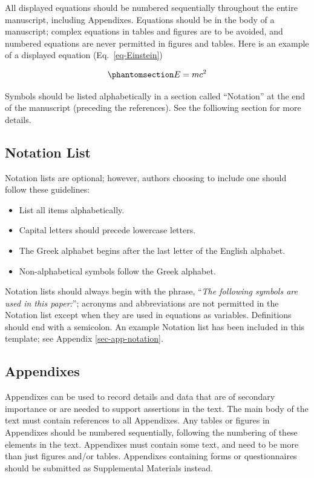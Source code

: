 \documentclass[Journal,LineNumbers]{ascelike-new}
\begin{document}
All displayed equations should be numbered sequentially throughout the
entire manuscript, including Appendixes. Equations should be in the body
of a manuscript; complex equations in tables and figures are to be
avoided, and numbered equations are never permitted in figures and
tables. Here is an example of a displayed equation
(Eq.~\ref{eq-Einstein})

\begin{equation}\phantomsection\label{eq-Einstein}{
E = m c^{2}
}\end{equation}

Symbols should be listed alphabetically in a section called ``Notation''
at the end of the manuscript (preceding the references). See the
folliowing section for more details.

\subsection{Notation List}\label{notation-list}

Notation lists are optional; however, authors choosing to include one
should follow these guidelines:

\begin{itemize}
\item
  List all items alphabetically.
\item
  Capital letters should precede lowercase letters.
\item
  The Greek alphabet begins after the last letter of the English
  alphabet.
\item
  Non-alphabetical symbols follow the Greek alphabet.
\end{itemize}

Notation lists should always begin with the phrase, ``\emph{The
following symbols are used in this paper:}''; acronyms and abbreviations
are not permitted in the Notation list except when they are used in
equations as variables. Definitions should end with a semicolon. An
example Notation list has been included in this template; see Appendix
\ref{sec-app-notation}.

\subsection{Appendixes}\label{appendixes}

Appendixes can be used to record details and data that are of secondary
importance or are needed to support assertions in the text. The main
body of the text must contain references to all Appendixes. Any tables
or figures in Appendixes should be numbered sequentially, following the
numbering of these elements in the text. Appendixes must contain some
text, and need to be more than just figures and/or tables. Appendixes
containing forms or questionnaires should be submitted as Supplemental
Materials instead.
\end{document}
